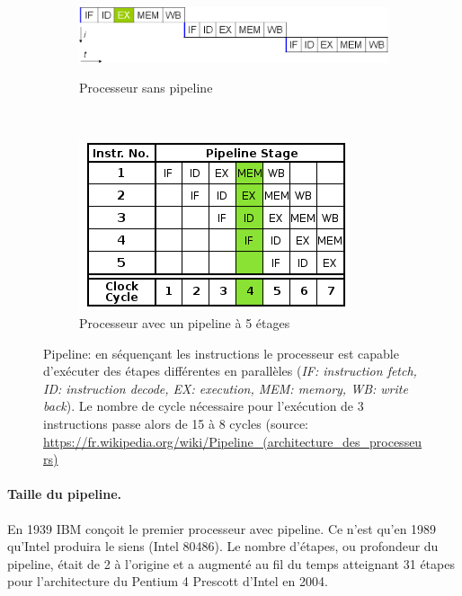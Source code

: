 \begin{figure}
    \begin{subfigure}[]{0.5\linewidth}\centering
        \vspace{1.6cm}
        \includegraphics[width=\linewidth]{images/Chapitre1/pipelineNo.png}
        \label{pic_pip_no}
        \caption{Processeur sans pipeline}
    \end{subfigure}%
    ~ %
    \begin{subfigure}[]{0.5\linewidth}\centering
        \includegraphics[width=.7\linewidth]{images/Chapitre1/pipelineYes.png}
        \caption{Processeur avec un pipeline à 5 étages}
        \label{pic_pip_yes}
    \end{subfigure}
    
    \caption{Pipeline: en séquençant les instructions le processeur est capable d'exécuter des étapes différentes en parallèles (\textit{IF: instruction fetch, ID: instruction decode, EX: execution, MEM: memory, WB: write back}). Le nombre de cycle nécessaire pour l'exécution de 3 instructions passe alors de 15 à 8 cycles (source: \url{https://fr.wikipedia.org/wiki/Pipeline_(architecture_des_processeurs)} }
    \label{pic_pipeline}
\end{figure}




\paragraph{Taille du pipeline.}
En 1939 IBM conçoit le premier processeur avec pipeline. Ce n'est qu'en 1989 qu'Intel produira le siens (Intel 80486). Le nombre d'étapes, ou profondeur du pipeline, était de 2 à l'origine et a augmenté au fil du temps atteignant 31 étapes pour l'architecture du Pentium 4 Prescott d'Intel en 2004. 

